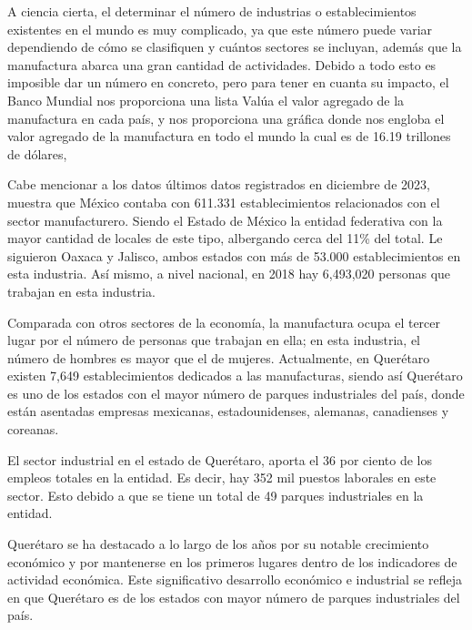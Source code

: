     
    A ciencia cierta, el determinar el número de industrias o establecimientos existentes en el mundo es muy complicado, ya que este número puede variar dependiendo de cómo se clasifiquen y cuántos sectores se incluyan, además que la manufactura abarca una gran cantidad de actividades. Debido a todo esto es imposible dar un número en concreto, pero para tener en cuanta su impacto, el Banco Mundial nos proporciona una lista Valúa el valor agregado de la manufactura en cada país, y nos proporciona una gráfica donde nos engloba el valor agregado de la manufactura en todo el mundo la cual es de 16.19 trillones de dólares,
    
      
    Cabe mencionar a  los datos últimos datos registrados en diciembre de 2023, muestra que México contaba con 611.331 establecimientos relacionados con el sector manufacturero. Siendo el Estado de México la entidad federativa con la mayor cantidad de locales de este tipo, albergando cerca del 11\% del total. Le siguieron Oaxaca y Jalisco, ambos estados con más de 53.000 establecimientos en esta industria. Así mismo, a nivel nacional, en 2018 hay 6,493,020 personas que trabajan en esta industria.
    
    Comparada con otros sectores de la economía, la manufactura ocupa el tercer lugar por el número de personas que trabajan en ella; en esta industria, el número de hombres es mayor que el de mujeres.
    Actualmente, en Querétaro existen 7,649 establecimientos dedicados a las manufacturas, siendo así Querétaro es uno de los estados con el mayor número de parques industriales del país, donde están asentadas empresas mexicanas, estadounidenses, alemanas, canadienses y coreanas.
       
        
        El sector industrial en el estado de Querétaro, aporta el 36 por ciento de los empleos totales en la entidad. Es decir, hay 352 mil puestos laborales en este sector. Esto debido a que se tiene un total de 49 parques industriales en la entidad.
        
        Querétaro se ha destacado a lo largo de los años por su notable crecimiento económico y por mantenerse en los primeros lugares dentro de los indicadores de actividad económica. Este significativo desarrollo económico e industrial se refleja en que Querétaro es de los estados con mayor número de parques industriales del país. \cite{JessicaIgnot}
        
